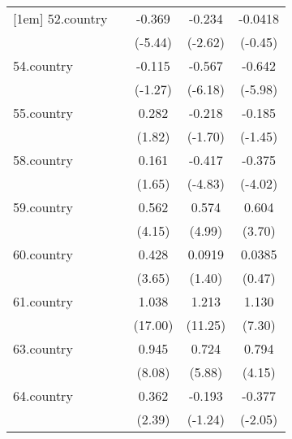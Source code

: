 {\begin{tabular}{l*{4}{c}}
[1em]
52.country  &                     &      -0.369\sym{***}&      -0.234\sym{**} &     -0.0418         \\
            &                     &     (-5.44)         &     (-2.62)         &     (-0.45)         \\
[1em]
54.country  &                     &      -0.115         &      -0.567\sym{***}&      -0.642\sym{***}\\
            &                     &     (-1.27)         &     (-6.18)         &     (-5.98)         \\
[1em]
55.country  &                     &       0.282         &      -0.218         &      -0.185         \\
            &                     &      (1.82)         &     (-1.70)         &     (-1.45)         \\
[1em]
58.country  &                     &       0.161         &      -0.417\sym{***}&      -0.375\sym{***}\\
            &                     &      (1.65)         &     (-4.83)         &     (-4.02)         \\
[1em]
59.country  &                     &       0.562\sym{***}&       0.574\sym{***}&       0.604\sym{***}\\
            &                     &      (4.15)         &      (4.99)         &      (3.70)         \\
[1em]
60.country  &                     &       0.428\sym{***}&      0.0919         &      0.0385         \\
            &                     &      (3.65)         &      (1.40)         &      (0.47)         \\
[1em]
61.country  &                     &       1.038\sym{***}&       1.213\sym{***}&       1.130\sym{***}\\
            &                     &     (17.00)         &     (11.25)         &      (7.30)         \\
[1em]
63.country  &                     &       0.945\sym{***}&       0.724\sym{***}&       0.794\sym{***}\\
            &                     &      (8.08)         &      (5.88)         &      (4.15)         \\
[1em]
64.country  &                     &       0.362\sym{*}  &      -0.193         &      -0.377\sym{*}  \\
            &                     &      (2.39)         &     (-1.24)         &     (-2.05)         \\

\end{tabular}}
